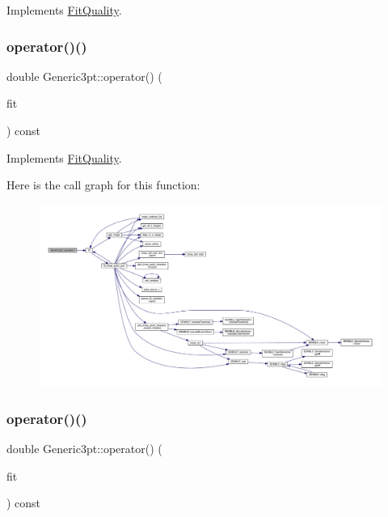 Implements \mbox{\hyperlink{classFitQuality_a3423e236f25d68cf822094b363a74780}{Fit\+Quality}}.

\mbox{\label{classGeneric3pt_ae10e73d761543be321a101ce1e57b49e}} 
\subsubsection{\texorpdfstring{operator()()}{operator()()}\hspace{0.1cm}{\footnotesize\ttfamily [1/2]}}
{\footnotesize\ttfamily double Generic3pt\+::operator() (\begin{DoxyParamCaption}\item[{const \mbox{\hyperlink{classAvgFit}{Avg\+Fit}} \&}]{fit }\end{DoxyParamCaption}) const\hspace{0.3cm}{\ttfamily [virtual]}}



Implements \mbox{\hyperlink{classFitQuality_a49a49e1206709d71c3ead41e981bb848}{Fit\+Quality}}.

Here is the call graph for this function\+:
\nopagebreak
\begin{figure}[H]
\begin{center}
\leavevmode
\includegraphics[width=350pt]{d9/ddb/classGeneric3pt_ae10e73d761543be321a101ce1e57b49e_cgraph}
\end{center}
\end{figure}
\mbox{\label{classGeneric3pt_ae10e73d761543be321a101ce1e57b49e}} 
\subsubsection{\texorpdfstring{operator()()}{operator()()}\hspace{0.1cm}{\footnotesize\ttfamily [2/2]}}
{\footnotesize\ttfamily double Generic3pt\+::operator() (\begin{DoxyParamCaption}\item[{const \mbox{\hyperlink{classAvgFit}{Avg\+Fit}} \&}]{fit }\end{DoxyParamCaption}) const\hspace{0.3cm}{\ttfamily [virtual]}}



